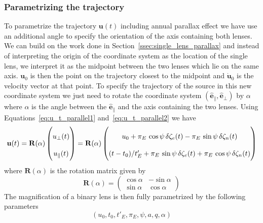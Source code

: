 \documentclass[12pt]{report}
\begin{document}
\subsubsection{Parametrizing the trajectory}
To parametrize the trajectory $\mathbf u(t)$ including annual parallax effect
we have use an additional angle to specify the orientation of the axis
containing both lenses. We can build on the work done in
Section~\ref{ssec:single_lens_parallax} and instead of interpreting the origin
of the coordinate system as the location of the single lens, we interpret it as
the midpoint between the two lenses which lie on the same axis. $\mathbf u_0$
is then the point on the trajectory closest to the midpoint and $\dot{\mathbf
        u}_0$ is the velocity vector at that point. To specify the trajectory of the
source in this new coordinate system we just need to rotate the coordinate
system $(\hat{\mathbf e}_\parallel, \hat{\mathbf e}_\bot)$ by $\alpha$ where $\alpha$ is the angle between
the $\hat{\mathbf e}_\parallel$ and the axis containing the two lenses. Using
Equations~\ref{eq:u_t_parallel1} and~\ref{eq:u_t_parallel2} we have
\begin{equation}
    \mathbf u(t)  =
    \mathbf R(\alpha)
    \begin{pmatrix}
        u_\bot (t) \\
        u_\parallel (t)
    \end{pmatrix}
    =
    \mathbf R(\alpha)
    \renewcommand\arraystretch{2}
    \begin{pmatrix}
        u_0 + \pi_E\,\cos\psi\,\delta \zeta_e(t) - \pi_E\,\sin\psi\,\delta \zeta_n(t) \\
        (t-t_0)/t_E' + \pi_E\,\sin\psi\,\delta \zeta_e(t) +
        \pi_E\,\cos\psi\,\delta \zeta_n(t)
    \end{pmatrix}
\end{equation}
where $\mathbf R (\alpha)$ is the rotation matrix  given by
\begin{equation}
    \mathbf R (\alpha)=
    \begin{pmatrix}
        \cos\alpha & -\sin\alpha \\
        \sin\alpha & \cos\alpha
    \end{pmatrix}
\end{equation}
The magnification of a binary lens is then fully parametrized by the following parameters
\begin{equation}
    (u_0,t_0,t'_E,\pi_E,\psi, a, q, \alpha)
\end{equation}
\end{document}
